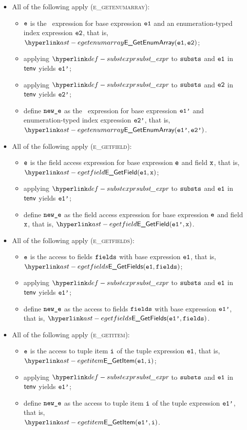 \begin{itemize}
  \item All of the following apply (\textsc{e\_getenumarray}):
  \begin{itemize}
    \item $\texttt{e}$ is the \arrayaccess\ expression for base expression $\texttt{e1}$ and an enumeration-typed index expression $\texttt{e2}$,
          that is, $\EGetEnumArray(\veone, \vetwo)$;
    \item applying $\substexpr$ to $\texttt{substs}$ and $\texttt{e1}$ in $\textsf{tenv}$ yields $\texttt{e1'}$;
    \item applying $\substexpr$ to $\texttt{substs}$ and $\texttt{e2}$ in $\textsf{tenv}$ yields $\texttt{e2'}$;
    \item define $\texttt{new\_e}$ as the \arrayaccess\ expression for base expression $\texttt{e1'}$ and \\
          enumeration-typed index expression $\texttt{e2'}$,
          that is, $\EGetEnumArray(\veonep, \vetwop)$.
  \end{itemize}

  \item All of the following apply (\textsc{e\_getfield}):
  \begin{itemize}
    \item $\texttt{e}$ is the field access expression for base expression $\texttt{e}$ and field $\texttt{x}$,
          that is, $\EGetField(\veone, \vx)$;
    \item applying $\substexpr$ to $\texttt{substs}$ and $\texttt{e1}$ in $\textsf{tenv}$ yields $\texttt{e1'}$;
    \item define $\texttt{new\_e}$ as the field access expression for base expression $\texttt{e}$ and field $\texttt{x}$,
          that is, $\EGetField(\veonep, \vx)$.
  \end{itemize}

  \item All of the following apply (\textsc{e\_getfields}):
  \begin{itemize}
    \item $\texttt{e}$ is the access to fields $\texttt{fields}$ with base expression $\texttt{e1}$, that is, \\
          $\EGetFields(\veone, \fields)$;
    \item applying $\substexpr$ to $\texttt{substs}$ and $\texttt{e1}$ in $\textsf{tenv}$ yields $\texttt{e1'}$;
    \item define $\texttt{new\_e}$ as the access to fields $\texttt{fields}$ with base expression $\texttt{e1'}$, that is, $\EGetFields(\veonep, \fields)$.
  \end{itemize}

  \item All of the following apply (\textsc{e\_getitem}):
  \begin{itemize}
    \item $\texttt{e}$ is the access to tuple item $\texttt{i}$ of the tuple expression $\texttt{e1}$, that is, \\
          $\EGetItem(\veone, \vi)$;
    \item applying $\substexpr$ to $\texttt{substs}$ and $\texttt{e1}$ in $\textsf{tenv}$ yields $\texttt{e1'}$;
    \item define $\texttt{new\_e}$ as the access to tuple item $\texttt{i}$ of the tuple expression $\texttt{e1'}$, that is, \\
          $\EGetItem(\veonep, \vi)$.
  \end{itemize}


\end{itemize}
